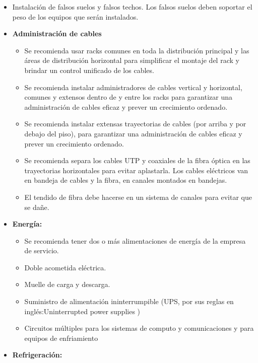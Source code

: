 \begin{itemize}
\begin{itemize}
        \end{itemize}
        \item Instalación de falsos suelos y falsos techos. Los falsos suelos deben soportar el peso de los equipos que serán instalados.
        \item \textbf{Administración de cables}
            \begin{itemize}
                    \item Se recomienda usar racks comunes en toda la distribución principal y las áreas de distribución horizontal para simplificar el montaje del rack y brindar un control unificado de los cables.
                    \item Se recomienda instalar administradores de cables vertical y horizontal, comunes y extensos dentro de y entre los racks para garantizar una administración de cables eficaz y prever un crecimiento ordenado.
                    \item Se recomienda instalar extensas trayectorias de cables (por arriba y por debajo del piso), para garantizar una administración de cables eficaz y prever un crecimiento ordenado.
                    \item Se recomienda separa los cables UTP y coaxiales de la fibra óptica en las trayectorias horizontales para evitar aplastarla. Los cables eléctricos van en bandeja de cables y la fibra, en canales montados en bandejas.
                    \item El tendido de fibra debe hacerse en un sistema de canales para evitar que se dañe.
            \end{itemize}
         \item  \textbf{Energía:}         
            \begin{itemize}
	            \item Se recomienda tener dos o más alimentaciones de energía de la empresa de servicio.
                \item Doble acometida eléctrica.
                \item Muelle de carga y descarga.
                \item Suministro de alimentación ininterrumpible (UPS, por sus reglas en inglés:Uninterrupted power supplies )
                \item Circuitos múltiples para los sistemas de computo y comunicaciones y para equipos de enfriamiento
            \end{itemize}
          \item \textbf{Refrigeración:}           

\end{itemize}
